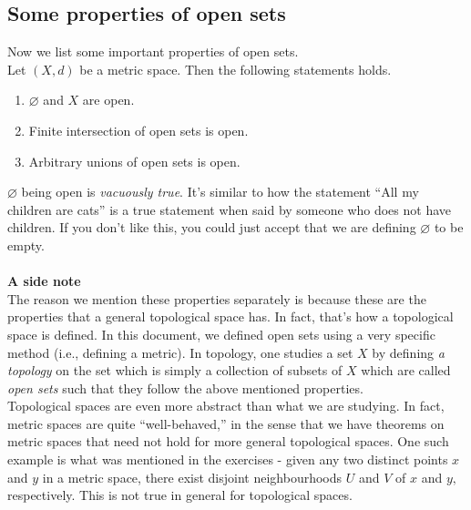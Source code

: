 \documentclass{article}
\let\emptyset\varnothing
\newcounter{exercise}
\begin{document}
	\subsection{Some properties of open sets}
	Now we list some important properties of open sets.\\
	Let $(X, d)$ be a metric space. Then the following statements holds.
	\begin{enumerate} 
		\item $\emptyset$ and $X$ are open.
		\item Finite intersection of open sets is open.
		\item Arbitrary unions of open sets is open.
	\end{enumerate}
	$\emptyset$ being open is \emph{vacuously true}. It's similar to how the statement ``All my children are cats'' is a true statement when said by someone who does not have children. If you don't like this, you could just accept that we are defining $\emptyset$ to be empty.\\~\\
	\textbf{A side note}\\
	The reason we mention these properties separately is because these are the properties that a general topological space has. In fact, that's how a topological space is defined. In this document, we defined open sets using a very specific method (i.e., defining a metric). In topology, one studies a set $X$ by defining \emph{a topology} on the set which is simply a collection of subsets of $X$ which are called \emph{open sets} such that they follow the above mentioned properties.\\
	Topological spaces are even more abstract than what we are studying. In fact, metric spaces are quite ``well-behaved,'' in the sense that we have theorems on metric spaces that need not hold for more general topological spaces. One such example is what was mentioned in the exercises - given any two distinct points $x$ and $y$ in a metric space, there exist disjoint neighbourhoods $U$ and $V$ of $x$ and $y,$ respectively. This is not true in general for topological spaces.
\end{document}
